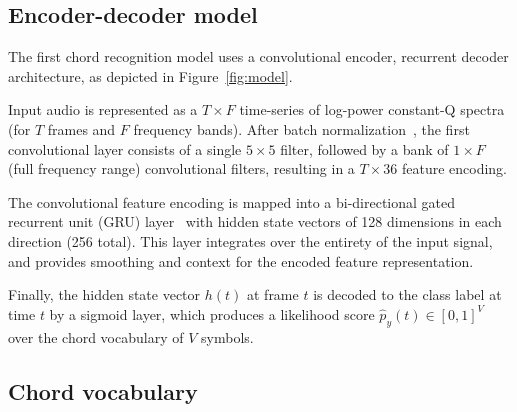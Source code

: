 \documentclass{article}
\begin{document}




\subsection{Encoder-decoder model}


The first chord recognition model uses a convolutional encoder, recurrent decoder architecture, as depicted in Figure~\ref{fig:model}. %
\begin{figure*}
    \caption{Illustration of model architectures goes here.\label{fig:model}}
\end{figure*}
Input audio is represented as a $T\times F$ time-series of log-power constant-Q spectra (for $T$ frames and $F$ frequency bands).
After batch normalization~\cite{ioffe2015batch}, the first convolutional layer consists of a single $5\times5$ filter, followed by a bank of $1\times F$ (full frequency range) convolutional filters, resulting in a $T\times 36$ feature encoding.

The convolutional feature encoding is mapped into a bi-directional gated recurrent unit (GRU) layer~\cite{chung2014empirical} with hidden state vectors of 128 dimensions in each direction (256 total).
This layer integrates over the entirety of the input signal, and provides smoothing and context for the encoded feature representation.

Finally, the hidden state vector $h(t)$ at frame $t$ is decoded to the class label at time $t$ by a sigmoid layer, which produces a likelihood score $\hat{p}_y(t) \in [0, 1]^{V}$ over the chord vocabulary of $V$ symbols.










\subsection{Chord vocabulary}
\end{document}
